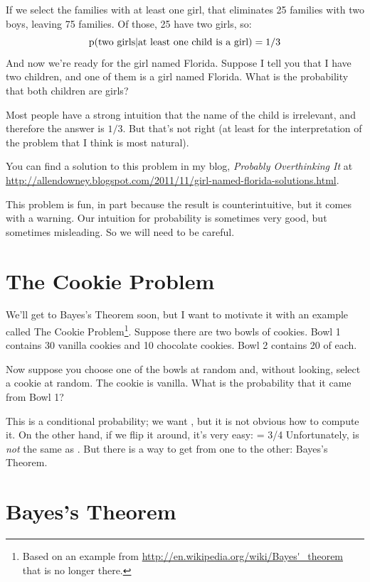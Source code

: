 \documentclass[12pt]{book}
\begin{document}
If we select the families with at least one girl, that eliminates
25 families with two boys, leaving 75 families.  Of those, 25
have two girls, so:
%
\[ \mathrm{p}(\mbox{two girls} | \mbox{at least one child is a girl}) = 1/3 \]
%
And now we're ready for the girl named Florida.  Suppose I tell
you that I have two children, and one of them is a girl named
Florida.  What is the probability that both children are girls?

Most people have a strong intuition that the name of the child
is irrelevant, and therefore the answer is $1/3$.  But that's
not right (at least for the interpretation of the problem that
I think is most natural).

You can find a solution to this problem in my blog, {\it Probably
  Overthinking It} at
\url{http://allendowney.blogspot.com/2011/11/girl-named-florida-solutions.html}.

This problem is fun, in part because the result is
counterintuitive, but it comes with a warning.  Our
intuition for probability is sometimes very good, but sometimes
misleading.  So we will need to be careful.


\section{The Cookie Problem}

We'll get to Bayes's Theorem soon, but I want to motivate it with an
example called The Cookie Problem\footnote{Based on an example from
  \url{http://en.wikipedia.org/wiki/Bayes'_theorem} that is no longer
  there.}.  Suppose there are two bowls of cookies.  Bowl 1 contains
  30 vanilla cookies and 10 chocolate cookies.  Bowl 2 contains 20 of
  each.

Now suppose you choose one of the bowls at random and, without looking,
select a cookie at random.  The cookie is vanilla.  What is the probability
that it came from Bowl 1?

This is a conditional probability; we want ,
but it is not obvious how to compute it.  On the other
hand, if we flip it around, it's very easy:
%
 = 3/4
%
Unfortunately,  is {\em not} the same as .  But there
is a way to get from one to the other: Bayes's Theorem.


\section{Bayes's Theorem}
\end{document}

